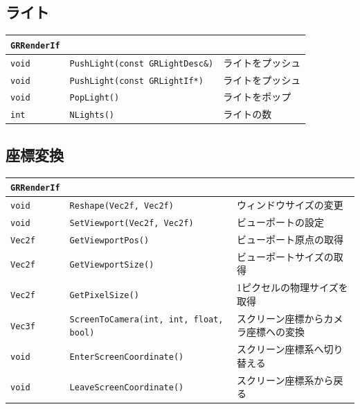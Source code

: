 \subsection*{ライト}

\begin{center}
\begin{tabular}{p{.1\hsize}p{.45\hsize}p{.35\hsize}}
\texttt{GRRenderIf}													\\ \midrule
\texttt{void} & \texttt{PushLight(const GRLightDesc\&)}	& ライトをプッシュ	\\
\texttt{void} & \texttt{PushLight(const GRLightIf*)}	& ライトをプッシュ	\\
\texttt{void} & \texttt{PopLight()}						& ライトをポップ	\\
\texttt{int}  & \texttt{NLights()}						& ライトの数		\\
\end{tabular}
\end{center}

\subsection*{座標変換}

\begin{center}
\begin{tabular}{p{.1\hsize}p{.45\hsize}p{.35\hsize}}
\texttt{GRRenderIf}												\\ \midrule
\texttt{void} 	& \texttt{Reshape(Vec2f, Vec2f)}					& ウィンドウサイズの変更				\\
\texttt{void} 	& \texttt{SetViewport(Vec2f, Vec2f)}				& ビューポートの設定					\\
\texttt{Vec2f} 	& \texttt{GetViewportPos()}							& ビューポート原点の取得				\\
\texttt{Vec2f} 	& \texttt{GetViewportSize()}						& ビューポートサイズの取得				\\
\texttt{Vec2f} 	& \texttt{GetPixelSize()}							& 1ピクセルの物理サイズを取得			\\
\texttt{Vec3f}	& \texttt{ScreenToCamera(int, int, float, bool)}	& スクリーン座標からカメラ座標への変換	\\
\texttt{void} 	& \texttt{EnterScreenCoordinate()}					& スクリーン座標系へ切り替える			\\
\texttt{void} 	& \texttt{LeaveScreenCoordinate()}					& スクリーン座標系から戻る				\\
\end{tabular}
\end{center}

